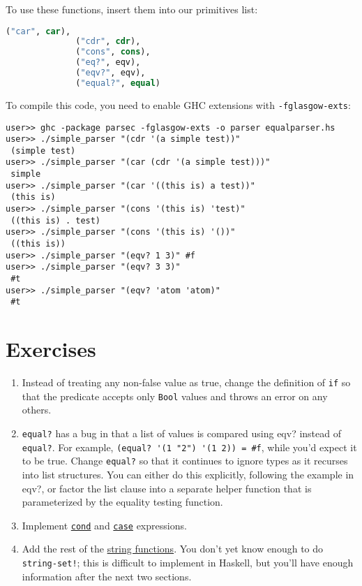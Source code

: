 To use these functions, insert them into our primitives list:
 
\begin{lstlisting}[language=lisp]
              ("car", car),
              ("cdr", cdr),
              ("cons", cons),
              ("eq?", eqv),
              ("eqv?", eqv),
              ("equal?", equal)
\end{lstlisting}
 
 
To compile this code, you need to enable GHC extensions with \verb|-fglasgow-exts|:
 
\begin{lstlisting}[language=shell,numbers=none,nolol]
user>> ghc -package parsec -fglasgow-exts -o parser equalparser.hs
user>> ./simple_parser "(cdr '(a simple test))"
 (simple test)
user>> ./simple_parser "(car (cdr '(a simple test)))"
 simple
user>> ./simple_parser "(car '((this is) a test))"
 (this is)
user>> ./simple_parser "(cons '(this is) 'test)"
 ((this is) . test)
user>> ./simple_parser "(cons '(this is) '())"
 ((this is))
user>> ./simple_parser "(eqv? 1 3)" #f
user>> ./simple_parser "(eqv? 3 3)"
 #t
user>> ./simple_parser "(eqv? 'atom 'atom)"
 #t
\end{lstlisting}
 
\section{Exercises}
 
\begin{enumerate}
	\item Instead of treating any non-false value as true, change the definition of \verb|if| so that the predicate accepts only \verb|Bool| values and throws an error on any others.
	\item \verb|equal?| has a bug in that a list of values is compared using eqv? instead of \verb|equal?|. For example, \verb|(equal? '(1 "2") '(1 2)) = #f|, while you'd expect it to be true. Change \verb|equal?| so that it continues to ignore types as it recurses into list structures. You can either do this explicitly, following the example in eqv?, or factor the list clause into a separate helper function that is parameterized by the equality testing function.
	\item Implement \href{http://www.schemers.org/Documents/Standards/R5RS/HTML/r5rs-Z-H-7.html\#\%_idx_106}{\texttt{cond}} and \href{http://www.schemers.org/Documents/Standards/R5RS/HTML/r5rs-Z-H-7.html\#\%_idx_114}{\texttt{case}} expressions.
	\item Add the rest of the \href{http://www.schemers.org/Documents/Standards/R5RS/HTML/r5rs-Z-H-9.html\#\%_sec_6.3.5}{string functions}. You don't yet know enough to do \verb|string-set!|; this is difficult to implement in Haskell, but you'll have enough information after the next two sections.
\end{enumerate}
